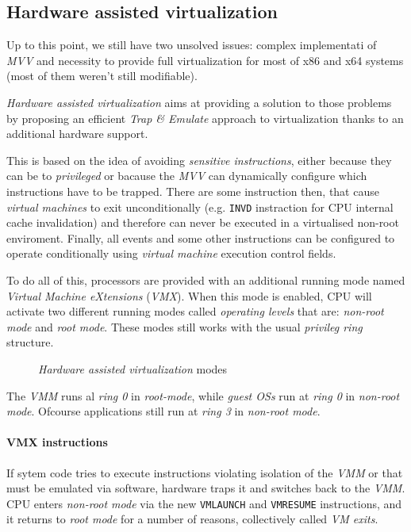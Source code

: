 \subsection{Hardware assisted virtualization}
Up to this point, we still have two unsolved issues: complex implementati of
\emph{MVV} and necessity to provide full virtualization for most of x86 and x64
systems (most of them weren't still modifiable).

\emph{Hardware assisted virtualization} aims at providing a solution to those
problems by proposing an efficient \emph{Trap \& Emulate} approach to
virtualization thanks to an additional hardware support.

This is based on the idea of avoiding \emph{sensitive instructions}, either
because they can be  to \emph{privileged} or bacause the \emph{MVV}
can dynamically configure which instructions have to be trapped. There are some
instruction then, that cause \emph{virtual machines} to exit unconditionally
(e.g. \texttt{INVD} instraction for CPU internal cache invalidation) and therefore
can never be executed in a virtualised non-root enviroment. Finally, all
events and some other instructions can be configured to operate conditionally
using \emph{virtual machine} execution control fields.

To do all of this, processors are provided with an additional running mode
named \emph{Virtual Machine eXtensions} (\emph{VMX}). When this mode is enabled,
CPU will activate two different running modes called \emph{operating levels}
that are: \emph{non-root mode} and \emph{root mode}. These modes still works
with the usual \emph{privileg ring} structure.

\begin{figure}[h!]
    \centering
    \caption{\emph{Hardware assisted virtualization} modes}
\end{figure}\noindent
The \emph{VMM} runs al \emph{ring 0} in \emph{root-mode}, while \emph{guest OSs}
run at \emph{ring 0} in \emph{non-root mode}. Ofcourse applications still run
at \emph{ring 3} in \emph{non-root mode}.

\paragraph{VMX instructions}
If sytem code tries to execute instructions violating isolation of the \emph{VMM}
or that must be emulated via software, hardware traps it and switches back to
the \emph{VMM}. CPU enters \emph{non-root mode} via the new \texttt{VMLAUNCH}
and \texttt{VMRESUME} instructions, and it returns to \emph{root mode} for a
number of reasons, collectively called \emph{VM exits}.

